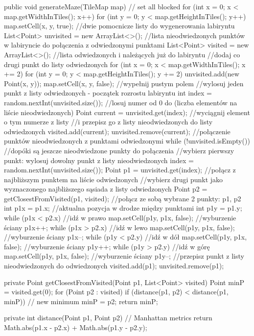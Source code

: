 public void generateMaze(TileMap map) {
	// set all blocked
	for (int x = 0; x < map.getWidthInTiles(); x++) {
		for (int y = 0; y < map.getHeightInTiles(); y++) {
			map.setCell(x, y, true);
		}
	}
	//dwie pomocnicze listy do wygenerowania labiryntu
	List<Point> unvisited = new ArrayList<>(); //lista nieodwiedzonych punktów w labiryncie do połączenia z odwiedzonymi punktami
	List<Point> visited = new ArrayList<>(); //lista odwiedzonych i należących już do labiryntu
	//dodaj co drugi punkt do listy odwiedzonych
	for (int x = 0; x < map.getWidthInTiles(); x += 2) {
		for (int y = 0; y < map.getHeightInTiles(); y += 2) {
			unvisited.add(new Point(x, y));
			map.setCell(x, y, false); //wypełnij pustym polem
		}
	}
	//wylosuj jeden punkt z listy odwiedzonych - początek rozrostu labiryntu
	int index = random.nextInt(unvisited.size()); //losuj numer od 0 do (liczba elementów na liście nieodwiedzonych)
	Point current = unvisited.get(index); //wyciągnij element o tym numerze z listy
	//i przepisz go z listy nieodwiedzonych do listy odwiedzonych
	visited.add(current);
	unvisited.remove(current);
	//połączenie punktów nieodwiedzonych z punktami odwiedzonymi
	while (!unvisited.isEmpty()) { //dopóki są jeszcze nieodwiedzone punkty do połączenia
		//wybierz pierwszy punkt: wylosuj dowolny punkt z listy nieodwiedzonych
		index = random.nextInt(unvisited.size());
		Point p1 = unvisited.get(index);
		//połącz z najbliższym punktem na liście odwiedzonych
		//wybierz drugi punkt jako wyznaczonego najbliższego sąsiada z listy odwiedzonych
		Point p2 = getClosestFromVisited(p1, visited);
		//połącz ze sobą wybrane 2 punkty: p1, p2
		int p1x = p1.x; //aktualna pozycja w drodze między punktami
		int p1y = p1.y;
		while (p1x < p2.x) { //idź w prawo
			map.setCell(p1y, p1x, false); //wyburzenie ściany
			p1x++;
		}
		while (p1x > p2.x) { //idź w lewo
			map.setCell(p1y, p1x, false); //wyburzenie ściany
			p1x--;
		}
		while (p1y < p2.y) { //idź w dół
			map.setCell(p1y, p1x, false); //wyburzenie ściany
			p1y++;
		}
		while (p1y > p2.y) { //idź w górę
			map.setCell(p1y, p1x, false); //wyburzenie ściany
			p1y--;
		}
		//przepisz punkt z listy nieodwiedzonych do odwiedzonych
		visited.add(p1);
		unvisited.remove(p1);
	}
}

private Point getClosestFromVisited(Point p1, List<Point> visited) {
	Point minP = visited.get(0);
	for (Point p2 : visited) {
		if (distance(p1, p2) < distance(p1, minP)) // new minimum
			minP = p2;
	}
	return minP;
}

private int distance(Point p1, Point p2) {
	// Manhattan metrics
	return Math.abs(p1.x - p2.x) + Math.abs(p1.y - p2.y);
}